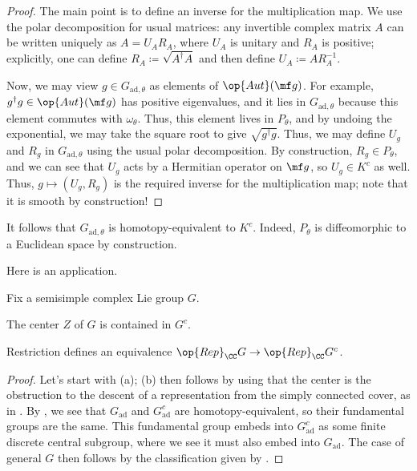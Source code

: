 \documentclass[../notes.tex]{subfiles}
\begin{document}
\begin{proof}
	The main point is to define an inverse for the multiplication map. We use the polar decomposition for usual matrices: any invertible complex matrix $A$ can be written uniquely as $A=U_AR_A$, where $U_A$ is unitary and $R_A$ is positive; explicitly, one can define $R_A\coloneqq\sqrt{A^\dagger A}$ and then define $U_A\coloneqq AR_A^{-1}$.

	Now, we may view $g\in G_{\mathrm{ad},\theta}$ as elements of $\op{Aut}(\mf g)$. For example, $g^\dagger g\in\op{Aut}(\mf g)$ has positive eigenvalues, and it lies in $G_{\mathrm{ad},\theta}$ because this element commutes with $\omega_\theta$. Thus, this element lives in $P_\theta$, and by undoing the exponential, we may take the square root to give $\sqrt{g^\dagger g}$. Thus, we may define $U_g$ and $R_g$ in $G_{\mathrm{ad},\theta}$ using the usual polar decomposition. By construction, $R_g\in P_\theta$, and we can see that $U_g$ acts by a Hermitian operator on $\mf g$, so $U_g\in K^c$ as well. Thus, $g\mapsto(U_g,R_g)$ is the required inverse for the multiplication map; note that it is smooth by construction!
\end{proof}
\begin{remark}
	It follows that $G_{\mathrm{ad},\theta}$ is homotopy-equivalent to $K^c$. Indeed, $P_\theta$ is diffeomorphic to a Euclidean space by construction.
\end{remark}
Here is an application.
\begin{corollary} \label{cor:semisimple-restriction}
	Fix a semisimple complex Lie group $G$.
	\begin{listalph}
		\item The center $Z$ of $G$ is contained in $G^c$.
		\item Restriction defines an equivalence $\op{Rep}_\CC G\to\op{Rep}_\CC G^c$.
	\end{listalph}
\end{corollary}
\begin{proof}
	Let's start with (a); (b) then follows by using that the center is the obstruction to the descent of a representation from the simply connected cover, as in . By , we see that $G_{\mathrm{ad}}$ and $G_{\mathrm{ad}}^c$ are homotopy-equivalent, so their fundamental groups are the same. This fundamental group embeds into $G^c_{\mathrm{ad}}$ as some finite discrete central subgroup, where we see it must also embed into $G_{\mathrm{ad}}$. The case of general $G$ then follows by the classification given by .
\end{proof}
\end{document}
